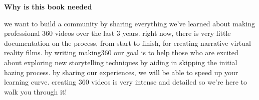 \textbf{Why is this book needed}
\begin{fullwidth}

we want to build a community by sharing everything we’ve learned about making professional 360 videos over the last 3 years. right now, there is very little documentation on the process, from start to finish, for creating narrative virtual reality films. by writing making360 our goal is to help those who are excited about exploring new storytelling techniques by aiding in skipping the initial hazing process. by sharing our experiences, we will be able to speed up your learning curve. creating 360 videos is very intense and detailed so we’re here to walk you through it!


\end{fullwidth}
